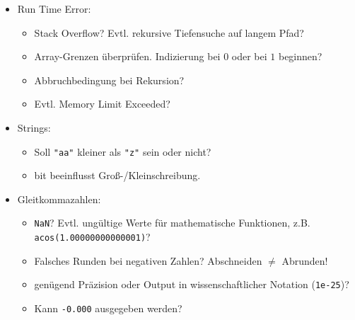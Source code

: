 \begin{itemize}
	\item Run Time Error:
	\begin{itemize}
		\item Stack Overflow? Evtl. rekursive Tiefensuche auf langem Pfad?
		\item Array-Grenzen überprüfen. Indizierung bei $0$ oder bei $1$ beginnen?
		\item Abbruchbedingung bei Rekursion?
		\item Evtl. Memory Limit Exceeded?
	\end{itemize}
	
	\item Strings:
	\begin{itemize}
		\item Soll \lstinline{"aa"} kleiner als \lstinline{"z"} sein oder nicht?
		\item bit  beeinflusst Groß-/Kleinschreibung.
	\end{itemize}
	
	\item Gleitkommazahlen:
	\begin{itemize}
		\item \lstinline{NaN}? Evtl. ungültige Werte für mathematische Funktionen, z.B. \mbox{\lstinline{acos(1.00000000000001)}}?
		\item Falsches Runden bei negativen Zahlen? Abschneiden $\neq$ Abrunden!
		\item genügend Präzision oder Output in wissenschaftlicher Notation (\lstinline{1e-25})?
		\item Kann \lstinline{-0.000} ausgegeben werden?
	\end{itemize}


\end{itemize}
